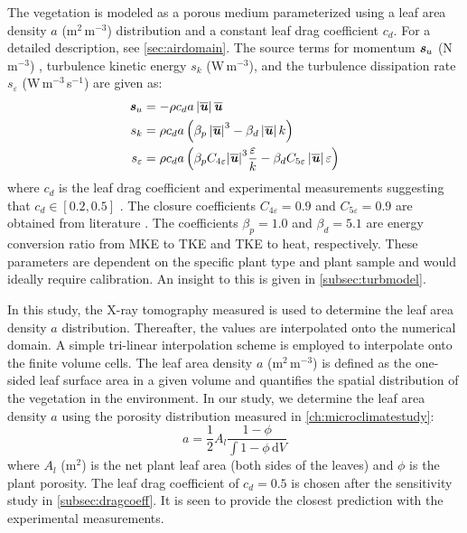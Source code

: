 The vegetation is modeled as a porous medium parameterized using a leaf area density $a$ (m$^2$\,m$^{-3}$) distribution and a constant leaf drag coefficient $c_d$. For a detailed description, see \cref{sec:airdomain}. The source terms for momentum $\textbf{\textit{s}}_u$ (N\,m$^{-3}$) , turbulence kinetic energy $s_k$ (W\,m$^{-3}$), and the turbulence dissipation rate $s_{\varepsilon}$ (W\,m$^{-3}$\,s$^{-1}$) are given as:
	\begin{align}
		\textbf{\textit{s}}_u &=  - \rho {c_d}a\left| \overline{\textbf{\textit{u}}} \right|\overline{\textbf{\textit{u}}} 	\label{eq:source_veg1}	 \\
		s_k &= \rho {c_d}a\left( \beta _p \left| \overline{\textbf{\textit{u}}} \right|^3 - \beta _d\left| \overline{\textbf{\textit{u}}} \right|k \right) \label{eq:source_veg2} \\
		s_\varepsilon &= \rho {c_d}a\left( {{\beta _p}{C_{4\varepsilon }}{{\left| \overline{\textbf{\textit{u}}} \right|}^3}\frac{\varepsilon }{k} - {\beta _d}{C_{5\varepsilon }}\left| \overline{\textbf{\textit{u}}} \right|\varepsilon } \right)
		\label{eq:source_veg3}
	\end{align}
where $c_d$ is the leaf drag coefficient \citep{Wilson1977} and experimental measurements suggesting that $c_d \in \left[0.2, 0.5\right]$ \citep{Vogel1989}. The closure coefficients $C_{4\varepsilon}=0.9$ and $C_{5\varepsilon}=0.9$ are obtained from literature \citep{Katul2004, Kenjeres2013, Sanz2003}. The coefficients $\beta_p=1.0$ and $\beta_d=5.1$ are energy conversion ratio from MKE to TKE and TKE to heat, respectively. These parameters are dependent on the specific plant type and plant sample and would ideally require calibration. An insight to this is given in \cref{subsec:turbmodel}.

In this study, the X-ray tomography measured is used to determine the leaf area density $a$ distribution. Thereafter, the values are interpolated onto the numerical domain. A simple tri-linear interpolation scheme is employed to interpolate onto the finite volume cells. The leaf area density $a$ (m$^2$\,m$^{-3}$) is defined as the one-sided leaf surface area in a given volume and quantifies the spatial distribution of the vegetation in the environment. In our study, we determine the leaf area density $a$ using the porosity distribution measured in \cref{ch:microclimatestudy}: 
	\begin{equation}
	a = \frac{1}{2} A_l \frac{1 - \phi}{\int {1 - \phi }\,\mathrm{d}V}
	\label{eq:leafdensitywteq}
	\end{equation}
where $A_l$ (m$^{2}$) is the net plant leaf area (both sides of the leaves) and $\phi$ is the plant porosity. The leaf drag coefficient of $c_d = 0.5$ is chosen after the sensitivity study in \cref{subsec:dragcoeff}. It is seen to provide the closest prediction with the experimental measurements.

